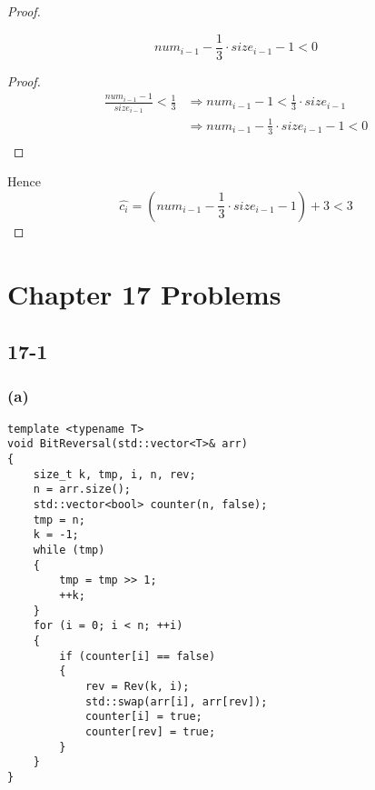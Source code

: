 \begin{proof}
    \begin{lemma}
        \begin{equation*}
            num_{i-1} - \frac{1}{3} \cdot size_{i-1} - 1 < 0
        \end{equation*}
    \end{lemma}

    \begin{proof}
        \begin{equation*}
        \begin{split}
            \frac{num_{i-1}-1}{size_{i-1}} < \frac{1}{3}
            & \Longrightarrow num_{i-1} - 1 < \frac{1}{3} \cdot size_{i-1} \\
            & \Longrightarrow num_{i-1} - \frac{1}{3} \cdot size_{i-1} - 1 < 0 \\
        \end{split}
        \end{equation*}
    \end{proof}

    Hence
    \begin{equation*}
        \hat{c_i} = (num_{i-1} - \frac{1}{3} \cdot size_{i-1} - 1) + 3 < 3
    \end{equation*}
\end{proof}

\section*{Chapter 17 Problems}

\subsection*{17-1}

\subsubsection*{(a)}

\begin{verbatim}
template <typename T>
void BitReversal(std::vector<T>& arr)
{
    size_t k, tmp, i, n, rev;
    n = arr.size();
    std::vector<bool> counter(n, false);
    tmp = n;
    k = -1;
    while (tmp)
    {
        tmp = tmp >> 1;
        ++k;
    }
    for (i = 0; i < n; ++i)
    {
        if (counter[i] == false)
        {
            rev = Rev(k, i);
            std::swap(arr[i], arr[rev]);
            counter[i] = true;
            counter[rev] = true;
        }
    }
}
\end{verbatim}

